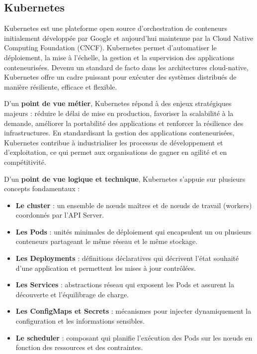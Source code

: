 \subsection{Kubernetes}

Kubernetes est une plateforme open source d’orchestration de conteneurs initialement développée par Google et aujourd’hui maintenue par la Cloud Native Computing Foundation (CNCF). Kubernetes permet d’automatiser le déploiement, la mise à l’échelle, la gestion et la supervision des applications conteneurisées. Devenu un standard de facto dans les architectures cloud-native, Kubernetes offre un cadre puissant pour exécuter des systèmes distribués de manière résiliente, efficace et flexible.

D’un \textbf{point de vue métier}, Kubernetes répond à des enjeux stratégiques majeurs  : réduire le délai de mise en production, favoriser la scalabilité à la demande, améliorer la portabilité des applications et renforcer la résilience des infrastructures. En standardisant la gestion des applications conteneurisées, Kubernetes contribue à industrialiser les processus de développement et d’exploitation, ce qui permet aux organisations de gagner en agilité et en compétitivité.

D’un \textbf{point de vue logique et technique}, Kubernetes s’appuie sur plusieurs concepts fondamentaux  :
\begin{itemize}
	\item \textbf{Le cluster}  : un ensemble de nœuds maîtres et de nœuds de travail (workers) coordonnés par l’API Server.
	\item \textbf{Les Pods}  : unités minimales de déploiement qui encapsulent un ou plusieurs conteneurs partageant le même réseau et le même stockage.
	\item \textbf{Les Deployments}  : définitions déclaratives qui décrivent l’état souhaité d’une application et permettent les mises à jour contrôlées.
	\item \textbf{Les Services}  : abstractions réseau qui exposent les Pods et assurent la découverte et l’équilibrage de charge.
	\item \textbf{Les ConfigMaps et Secrets}  : mécanismes pour injecter dynamiquement la configuration et les informations sensibles.
	\item \textbf{Le scheduler}  : composant qui planifie l’exécution des Pods sur les nœuds en fonction des ressources et des contraintes.
\end{itemize}

